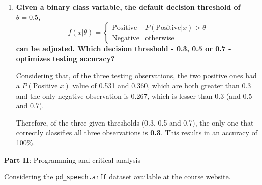 \documentclass[12pt]{article}
\begin{document}
\begin{enumerate}[leftmargin=\labelsep,resume]
    \item {\bfseries
          Given a binary class variable, the default decision threshold of $\theta = 0.5$,
          $$
              f(x|\theta) = \begin{cases}
                  \text{Positive} & P(\text{Positive}|x) > \theta \\
                  \text{Negative} & \text{otherwise}
              \end{cases}
          $$
          can be adjusted.
          Which decision threshold - 0.3, 0.5 or 0.7 - optimizes testing accuracy?
          }

          Considering that, of the three testing observations,
          the two positive ones had a $P(\text{Positive}|x)$ value
          of 0.531 and 0.360, which are both greater than 0.3
          and the only negative observation is 0.267, which is lesser
          than 0.3 (and 0.5 and 0.7).

          Therefore, of the three given thresholds (0.3, 0.5 and 0.7),
          the only one that correctly classifies all three observations
          is \textbf{0.3}. This results in an accuracy of 100\%.


\end{enumerate}

\begin{center}
    \large{\textbf{Part II}: Programming and critical analysis}
\end{center}

Considering the \texttt{pd\_speech.arff} dataset available at the course website.
\end{document}
